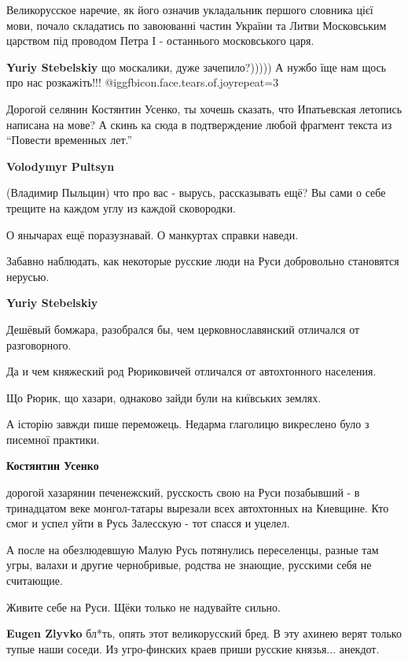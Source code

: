 \begin{itemize}
\begin{itemize}
\begin{itemize}
Великорусское наречие, як його означив укладальник першого словника цієї мови,
почало складатись по завоюванні частин України та Литви Московським царством
під проводом Петра І - останнього московського царя.

\textbf{Yuriy Stebelskiy} що москалики, дуже зачепило?)))))
А нужбо їще нам щось про нас розкажіть!!! @igg{fbicon.face.tears.of.joy}{repeat=3} 


Дорогой селянин Костянтин Усенко, ты хочешь сказать, что Ипатьевская летопись
написана на мове?  А скинь ка сюда в подтверждение любой фрагмент текста из
\enquote{Повести временных лет.}


\textbf{Volodymyr Pultsyn} 

(Владимир Пыльцин) что про вас - вырусь, рассказывать ещё? Вы сами о себе
трещите на каждом углу из каждой сковородки.

О янычарах ещё поразузнавай. О манкуртах справки наведи.

Забавно наблюдать, как некоторые русские люди на Руси добровольно становятся
нерусью.

\textbf{Yuriy Stebelskiy} 

Дешёвый бомжара, разобрался бы, чем церковнославянский отличался от
разговорного.

Да и чем княжеский род Рюриковичей отличался от автохтонного населения.

Що Рюрик, що хазари, однаково зайди були на київських землях.

А історію завжди пише переможець. Недарма глаголицю викреслено було з писемної
практики.


\textbf{Костянтин Усенко} 

дорогой хазарянин печенежский, русскость свою на Руси позабывший - в
тринадцатом веке монгол-татары вырезали всех автохтонных на Киевщине. Кто смог
и успел уйти в Русь Залесскую - тот спасся и уцелел.

А после на обезлюдевшую Малую Русь потянулись переселенцы, разные там угры,
валахи и другие чернобривые, родства не знающие, русскими себя не считающие.

Живите себе на Руси. Щёки только не надувайте сильно.


\textbf{Eugen Zlyvko} бл*ть, опять этот великорусский бред. В эту ахинею верят только тупые наши соседи.
Из угро-финских краев приши русские князья... анекдот.


\end{itemize}
\end{itemize}
\end{itemize}
